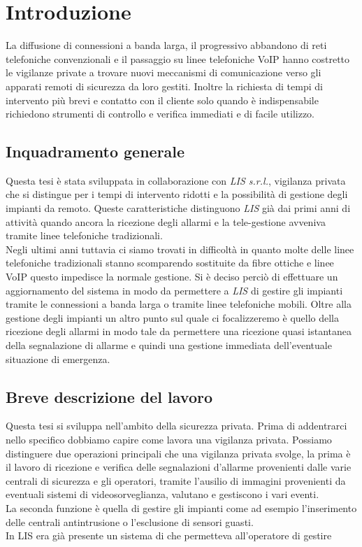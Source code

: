 \chapter{Introduzione}
\label{Introduzione}
\thispagestyle{empty}


\noindent La diffusione di connessioni a banda larga, il progressivo abbandono di reti telefoniche convenzionali e il passaggio su linee telefoniche VoIP hanno costretto le vigilanze private a trovare nuovi meccanismi di comunicazione verso gli apparati remoti di sicurezza da loro gestiti. Inoltre la richiesta di tempi di intervento più brevi e contatto con il cliente solo quando è indispensabile richiedono strumenti di controllo e verifica immediati e di facile utilizzo.

\section{Inquadramento generale}
Questa tesi è stata sviluppata in collaborazione con \emph{LIS s.r.l.}, vigilanza privata che si distingue per i tempi di intervento ridotti e la possibilità di gestione degli impianti da remoto. Queste caratteristiche distinguono \emph{LIS} già dai primi anni di attività quando ancora la ricezione degli allarmi e la tele-gestione avveniva tramite linee telefoniche tradizionali.\\
Negli ultimi anni tuttavia ci siamo trovati in difficoltà in quanto molte delle linee telefoniche tradizionali stanno scomparendo sostituite da fibre ottiche e linee VoIP questo impedisce la normale gestione. Si è deciso perciò di effettuare un aggiornamento del sistema in modo da permettere a \emph{LIS} di gestire gli impianti tramite le connessioni a banda larga o tramite linee telefoniche mobili. Oltre alla gestione degli impianti un altro punto sul quale ci focalizzeremo è quello della ricezione degli allarmi in modo tale da permettere una ricezione quasi istantanea della segnalazione di allarme e quindi una gestione immediata dell'eventuale situazione di emergenza.\\

\section{Breve descrizione del lavoro}
Questa tesi si sviluppa nell'ambito della sicurezza privata. Prima di addentrarci nello specifico dobbiamo capire come lavora una vigilanza privata. Possiamo distinguere due operazioni principali che una vigilanza privata svolge, la prima è il lavoro di ricezione e verifica delle segnalazioni d'allarme provenienti dalle varie centrali di sicurezza e gli operatori, tramite l'ausilio di immagini provenienti da eventuali sistemi di videosorveglianza, valutano e gestiscono i vari eventi.\\
La seconda funzione è quella di gestire gli impianti come ad esempio l'inserimento delle centrali antintrusione o l'esclusione di sensori guasti.\\
In LIS era già presente un sistema di che permetteva all'operatore di gestire 

